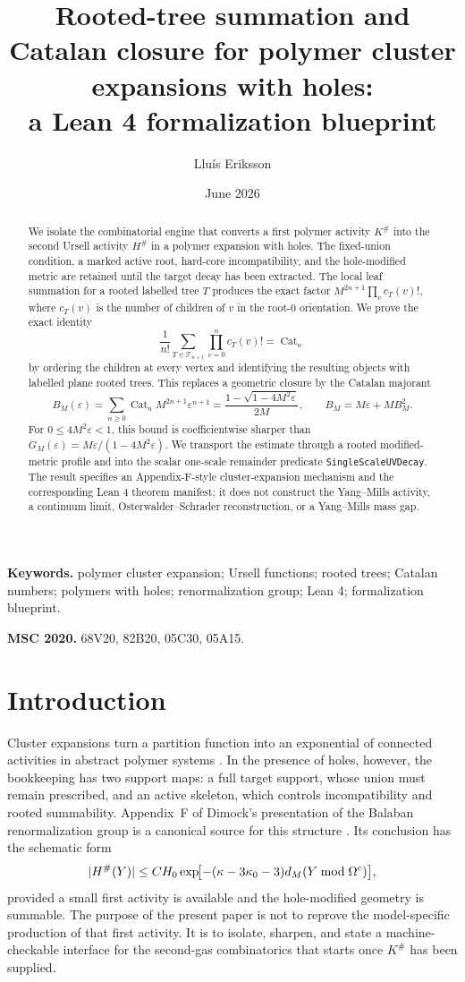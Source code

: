 \documentclass[11pt,a4paper]{article}
\title{\bfseries Rooted-tree summation and Catalan closure for polymer cluster expansions with holes:\\a Lean 4 formalization blueprint}
\author{Llu\'is Eriksson}
\date{June 2026}
\theoremstyle{definition}
\newcommand{\Cat}{\operatorname{Cat}}
\newcommand{\Tree}{\mathcal T}
\newcommand{\eps}{\varepsilon}
\newcommand{\Hsharp}{H^{\#}}
\newcommand{\Ksharp}{K^{\#}}
\DeclarePairedDelimiter{\abs}{\lvert}{\rvert}
\begin{document}
\maketitle

\begin{abstract}
We isolate the combinatorial engine that converts a first polymer activity
$\Ksharp$ into the second Ursell activity $\Hsharp$ in a polymer expansion with holes.
The fixed-union condition, a marked active root, hard-core incompatibility, and the
hole-modified metric are retained until the target decay has been extracted.  The local
leaf summation for a rooted labelled tree $T$ produces the exact factor
$M^{2n+1}\prod_v c_T(v)!$, where $c_T(v)$ is the number of children of $v$ in the
root-$0$ orientation.  We prove the exact identity
\[
  \frac{1}{n!}\sum_{T\in\Tree_{n+1}}\prod_{v=0}^{n}c_T(v)! = \Cat_n
\]
by ordering the children at every vertex and identifying the resulting objects with
labelled plane rooted trees.  This replaces a geometric closure by the Catalan majorant
\[
 B_M(\eps)=\sum_{n\ge0}\Cat_nM^{2n+1}\eps^{n+1}
 =\frac{1-\sqrt{1-4M^2\eps}}{2M},
 \qquad B_M=M\eps+M B_M^2.
\]
For $0\le4M^2\eps<1$, this bound is coefficientwise sharper than
$G_M(\eps)=M\eps/(1-4M^2\eps)$.  We transport the estimate through a rooted
modified-metric profile and into the scalar one-scale remainder predicate
\texttt{SingleScaleUVDecay}.  The result specifies an Appendix-F-style
cluster-expansion mechanism and the corresponding Lean 4 theorem manifest; it does not
construct the Yang--Mills activity, a continuum limit, Osterwalder--Schrader
reconstruction, or a Yang--Mills mass gap.
\end{abstract}

\noindent\textbf{Keywords.} polymer cluster expansion; Ursell functions; rooted trees;
Catalan numbers; polymers with holes; renormalization group; Lean 4; formalization blueprint.

\medskip
\noindent\textbf{MSC 2020.} 68V20, 82B20, 05C30, 05A15.

\tableofcontents

\section{Introduction}

Cluster expansions turn a partition function into an exponential of connected
activities in abstract polymer systems \cite{KoteckyPreiss1986}.  In the presence of
holes, however, the bookkeeping has two support maps: a full target support, whose union
must remain prescribed, and an active skeleton, which controls incompatibility and
rooted summability.  Appendix~F of Dimock's presentation of the Balaban
renormalization group is a canonical source for this structure
\cite{Dimock2013LargeFields}.  Its conclusion has the schematic form
\[
  \abs{\Hsharp(Y)}
  \le C H_0\exp\!\bigl[-(\kappa-3\kappa_0-3)d_M(Y\bmod\Omega^c)\bigr],
\]
provided a small first activity is available and the hole-modified geometry is
summable.  The purpose of the present paper is not to reprove the model-specific
production of that first activity.  It is to isolate, sharpen, and state a
machine-checkable interface for the second-gas combinatorics that starts once $\Ksharp$
has been supplied.
\end{document}
